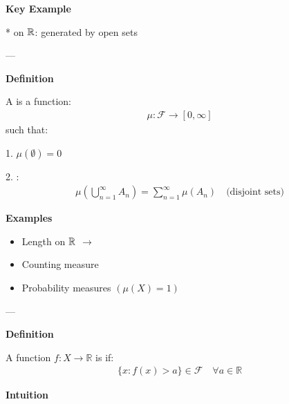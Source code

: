 \documentclass[12pt,a4paper]{report}
\begin{document}
\begin{description}
\begin{description}
    \item \textbf{Key Example}

*  on $\mathbb{R}$: generated by open sets
	\end{description}

---

\item {}

	\begin{description}
    \item \textbf{Definition}

A  is a function:
\begin{align*}
\mu: \mathcal{F} \to [0,\infty]
\end{align*}
such that:
		\begin{description}
        \item 1. $\mu(\emptyset) = 0$
        \item 2. :
     \begin{align*}
         \mu\left(\bigcup_{n=1}^\infty A_n\right) = \sum_{n=1}^\infty \mu(A_n) \quad \text{(disjoint sets)}
     \end{align*}
		\end{description}

    \item \textbf{Examples}

		\begin{itemize}
        \item Length on $\mathbb{R}$ $\to$ 
        \item Counting measure
        \item Probability measures $(\mu(X)=1)$
		\end{itemize}
	\end{description}

---

\item {}

	\begin{description}
    \item \textbf{Definition}

A function $f: X \to \mathbb{R}$ is  if:
\begin{align*}
\{x : f(x) > a\} \in \mathcal{F} \quad \forall a \in \mathbb{R}
\end{align*}

    \item \textbf{Intuition}


\end{description}
\end{description}
\end{document}
